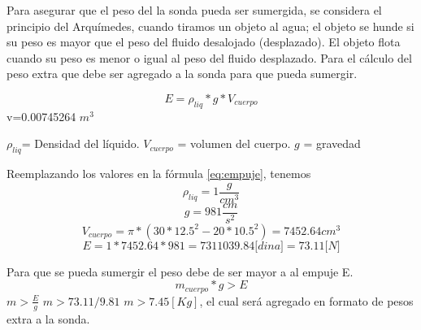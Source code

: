 Para asegurar que el peso del la sonda pueda ser sumergida, se considera el principio del Arqu\'imedes, cuando tiramos un objeto al agua; el objeto se hunde si su peso es mayor que el peso del fluido desalojado (desplazado). El objeto flota cuando su peso es menor o igual al peso del fluido desplazado. 
Para el c\'alculo del peso extra que debe ser agregado a la sonda para que pueda sumergir.

\begin{equation}
E=\rho_{liq}*g*V_{cuerpo} 
\label{eq:empuje}
\end{equation}
v=0.00745264 $m^3$

$\rho_{liq}$= Densidad del l\'iquido.
$V_{cuerpo}$ = volumen del cuerpo.
$g$ = gravedad

Reemplazando los valores en la f\'ormula \ref{eq:empuje}, tenemos
$$ \rho_{liq} = 1 \frac{g}{cm^{3}}$$  
$$ g= 981 \frac{cm}{s^{2}}$$
$$ V_{cuerpo}= \pi * (30*12.5^{2}-20*10.5^{2})= 7452.64 cm^{3}$$
$$ E= 1 * 7452.64 * 981 = 7311039.84 \textit{[dina]} = 73.11 \textit{[N]}$$

Para que se pueda sumergir el peso debe de ser mayor a al empuje E.
\begin{equation}
m_{cuerpo} * g > E 
\label{eq:empuje2}
\end{equation}
$m >\frac{E}{g}$
$m > 73.11/9.81$
$m > 7.45 [Kg] $, el cual ser\'a agregado en formato de pesos extra a la sonda.

